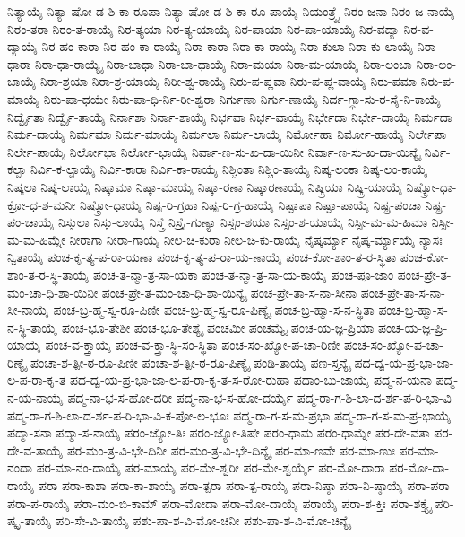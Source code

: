 {ನಿತ್ಯಾಯೈ
ನಿತ್ಯಾ-ಷೋ-ಡ-ಶಿ-ಕಾ-ರೂಪಾ
ನಿತ್ಯಾ-ಷೋ-ಡ-ಶಿ-ಕಾ-ರೂ-ಪಾಯೈ
ನಿಯಂತ್ರ್ಯೈ
ನಿರಂ-ಜನಾ
ನಿರಂ-ಜ-ನಾಯೈ
ನಿರಂ-ತರಾ
ನಿರಂ-ತ-ರಾಯೈ
ನಿರ-ತ್ಯಯಾ
ನಿರ-ತ್ಯ-ಯಾಯೈ
ನಿರ-ಪಾಯಾ
ನಿರ-ಪಾ-ಯಾಯೈ
ನಿರ-ವದ್ಯಾ
ನಿರ-ವ-ದ್ಯಾಯೈ
ನಿರ-ಹಂ-ಕಾರಾ
ನಿರ-ಹಂ-ಕಾ-ರಾಯೈ
ನಿರಾ-ಕಾರಾ
ನಿರಾ-ಕಾ-ರಾಯೈ
ನಿರಾ-ಕುಲಾ
ನಿರಾ-ಕು-ಲಾಯೈ
ನಿರಾ-ಧಾರಾ
ನಿರಾ-ಧಾ-ರಾಯ್ಯೈ
ನಿರಾ-ಬಾಧಾ
ನಿರಾ-ಬಾ-ಧಾಯೈ
ನಿರಾ-ಮಯಾ
ನಿರಾ-ಮ-ಯಾಯೈ
ನಿರಾ-ಲಂಬಾ
ನಿರಾ-ಲಂ-ಬಾಯೈ
ನಿರಾ-ಶ್ರಯಾ
ನಿರಾ-ಶ್ರ-ಯಾಯೈ
ನಿರೀ-ಶ್ವ-ರಾಯೈ
ನಿರು-ಪ-ಪ್ಲವಾ
ನಿರು-ಪ-ಪ್ಲ-ವಾಯೈ
ನಿರು-ಪಮಾ
ನಿರು-ಪ-ಮಾಯೈ
ನಿರು-ಪಾ-ಧಯೇ
ನಿರು-ಪಾ-ಧಿ-ರ್ನಿ-ರೀ-ಶ್ವರಾ
ನಿರ್ಗುಣಾ
ನಿರ್ಗು-ಣಾಯೈ
ನಿರ್ದ-ಗ್ಧಾ-ಸು-ರ-ಸೈ-ನಿ-ಕಾಯೈ
ನಿರ್ದ್ವೈತಾ
ನಿರ್ದ್ವೈ-ತಾಯೈ
ನಿರ್ನಾಶಾ
ನಿರ್ನಾ-ಶಾಯೈ
ನಿರ್ಭವಾ
ನಿರ್ಭ-ವಾಯೈ
ನಿರ್ಭೇದಾ
ನಿರ್ಭೇ-ದಾಯೈ
ನಿರ್ಮದಾ
ನಿರ್ಮ-ದಾಯೈ
ನಿರ್ಮಮಾ
ನಿರ್ಮ-ಮಾಯೈ
ನಿರ್ಮಲಾ
ನಿರ್ಮ-ಲಾಯೈ
ನಿರ್ಮೋಹಾ
ನಿರ್ಮೋ-ಹಾಯೈ
ನಿರ್ಲೇಪಾ
ನಿರ್ಲೇ-ಪಾಯೈ
ನಿರ್ಲೋಭಾ
ನಿರ್ಲೋ-ಭಾಯೈ
ನಿರ್ವಾ-ಣ-ಸು-ಖ-ದಾ-ಯಿನೀ
ನಿರ್ವಾ-ಣ-ಸು-ಖ-ದಾ-ಯಿನ್ಯೈ
ನಿರ್ವಿ-ಕಲ್ಪಾ
ನಿರ್ವಿ-ಕ-ಲ್ಪಾಯೈ
ನಿರ್ವಿ-ಕಾರಾ
ನಿರ್ವಿ-ಕಾ-ರಾಯೈ
ನಿಶ್ಚಿಂತಾ
ನಿಶ್ಚಿಂ-ತಾಯೈ
ನಿಷ್ಕ-ಲಂಕಾ
ನಿಷ್ಕ-ಲಂ-ಕಾಯೈ
ನಿಷ್ಕಲಾ
ನಿಷ್ಕ-ಲಾಯೈ
ನಿಷ್ಕಾಮಾ
ನಿಷ್ಕಾ-ಮಾಯೈ
ನಿಷ್ಕಾ-ರಣಾ
ನಿಷ್ಕಾರಣಾಯೈ
ನಿಷ್ಕ್ರಿಯಾ
ನಿಷ್ಕ್ರಿ-ಯಾಯೈ
ನಿಷ್ಕ್ರೋ-ಧಾ-ಕ್ರೋ-ಧ-ಶ-ಮನೀ
ನಿಷ್ಕ್ರೋ-ಧಾಯೈ
ನಿಷ್ಪ-ರಿ-ಗ್ರಹಾ
ನಿಷ್ಪ-ರಿ-ಗ್ರ-ಹಾಯೈ
ನಿಷ್ಪಾಪಾ
ನಿಷ್ಪಾ-ಪಾಯೈ
ನಿಷ್ಪ್ರ-ಪಂಚಾ
ನಿಷ್ಪ್ರ-ಪಂ-ಚಾಯೈ
ನಿಸ್ತುಲಾ
ನಿಸ್ತು-ಲಾಯೈ
ನಿಸ್ತ್ರೆ
ನಿಸ್ತ್ರೈ-ಗುಣ್ಯಾ
ನಿಸ್ಸಂ-ಶಯಾ
ನಿಸ್ಸಂ-ಶ-ಯಾಯೈ
ನಿಸ್ಸೀ-ಮ-ಮ-ಹಿಮಾ
ನಿಸ್ಸೀ-ಮ-ಮ-ಹಿಮ್ನೇ
ನೀರಾಗಾ
ನೀರಾ-ಗಾಯೈ
ನೀಲ-ಚಿ-ಕುರಾ
ನೀಲ-ಚಿ-ಕು-ರಾಯೈ
ನೈಷ್ಕರ್ಮ್ಯಾ
ನೈಷ್ಕ-ರ್ಮ್ಯಾಯೈ
ನ್ಯಾಸಃ
ನ್ವಿತಾಯೈ
ಪಂಚ-ಕೃ-ತ್ಯ-ಪ-ರಾ-ಯಣಾ
ಪಂಚ-ಕೃ-ತ್ಯ-ಪ-ರಾ-ಯ-ಣಾಯೈ
ಪಂಚ-ಕೋ-ಶಾಂ-ತ-ರ-ಸ್ಥಿತಾ
ಪಂಚ-ಕೋ-ಶಾಂ-ತ-ರ-ಸ್ಥಿ-ತಾಯೈ
ಪಂಚ-ತ-ನ್ಮಾ-ತ್ರ-ಸಾ-ಯಕಾ
ಪಂಚ-ತ-ನ್ಮಾ-ತ್ರ-ಸಾ-ಯ-ಕಾಯೈ
ಪಂಚ-ಪೂ-ಜಾಂ
ಪಂಚ-ಪ್ರೇ-ತ-ಮಂ-ಚಾ-ಧಿ-ಶಾ-ಯಿನೀ
ಪಂಚ-ಪ್ರೇ-ತ-ಮಂ-ಚಾ-ಧಿ-ಶಾ-ಯಿನ್ಯೈ
ಪಂಚ-ಪ್ರೇ-ತಾ-ಸ-ನಾ-ಸೀನಾ
ಪಂಚ-ಪ್ರೇ-ತಾ-ಸ-ನಾ-ಸೀ-ನಾಯೈ
ಪಂಚ-ಬ್ರ-ಹ್ಮ-ಸ್ವ-ರೂ-ಪಿಣೀ
ಪಂಚ-ಬ್ರ-ಹ್ಮ-ಸ್ವ-ರೂ-ಪಿಣ್ಯೈ
ಪಂಚ-ಬ್ರ-ಹ್ಮಾ-ಸ-ನ-ಸ್ಥಿತಾ
ಪಂಚ-ಬ್ರ-ಹ್ಮಾ-ಸ-ನ-ಸ್ಥಿ-ತಾಯೈ
ಪಂಚ-ಭೂ-ತೇಶೀ
ಪಂಚ-ಭೂ-ತೇಶ್ಯೈ
ಪಂಚಮೀ
ಪಂಚಮ್ಯೈ
ಪಂಚ-ಯ-ಜ್ಞ-ಪ್ರಿಯಾ
ಪಂಚ-ಯ-ಜ್ಞ-ಪ್ರಿ-ಯಾಯೈ
ಪಂಚ-ವ-ಕ್ತ್ರಾಯೈ
ಪಂಚ-ವ-ಕ್ತ್ರಾ-ಸ್ಥಿ-ಸಂ-ಸ್ಥಿತಾ
ಪಂಚ-ಸಂ-ಖ್ಯೋ-ಪ-ಚಾ-ರಿಣೀ
ಪಂಚ-ಸಂ-ಖ್ಯೋ-ಪ-ಚಾ-ರಿಣ್ಯೈ
ಪಂಚಾ-ಶ-ತ್ಪೀ-ಠ-ರೂ-ಪಿಣೀ
ಪಂಚಾ-ಶ-ತ್ಪೀ-ಠ-ರೂ-ಪಿಣ್ಯೈ
ಪಂಡಿ-ತಾಯೈ
ಪಣ-ಸ್ತನ್ಯೈ
ಪದ-ದ್ವ-ಯ-ಪ್ರ-ಭಾ-ಜಾ-ಲ-ಪ-ರಾ-ಕೃ-ತ
ಪದ-ದ್ವ-ಯ-ಪ್ರ-ಭಾ-ಜಾ-ಲ-ಪ-ರಾ-ಕೃ-ತ-ಸ-ರೋ-ರುಹಾ
ಪದಾಂ-ಬು-ಜಾಯೈ
ಪದ್ಮ-ನ-ಯನಾ
ಪದ್ಮ-ನ-ಯ-ನಾಯೈ
ಪದ್ಮ-ನಾ-ಭ-ಸ-ಹೋ-ದರೀ
ಪದ್ಮ-ನಾ-ಭ-ಸ-ಹೋ-ದರ್ಯೈ
ಪದ್ಮ-ರಾ-ಗ-ಶಿ-ಲಾ-ದ-ರ್ಶ-ಪ-ರಿ-ಭಾ-ವಿ
ಪದ್ಮ-ರಾ-ಗ-ಶಿ-ಲಾ-ದ-ರ್ಶ-ಪ-ರಿ-ಭಾ-ವಿ-ಕ-ಪೋ-ಲ-ಭೂಃ
ಪದ್ಮ-ರಾ-ಗ-ಸ-ಮ-ಪ್ರಭಾ
ಪದ್ಮ-ರಾ-ಗ-ಸ-ಮ-ಪ್ರ-ಭಾಯೈ
ಪದ್ಮಾ-ಸನಾ
ಪದ್ಮಾ-ಸ-ನಾಯೈ
ಪರಂ-ಜ್ಯೋ-ತಿಃ
ಪರಂ-ಜ್ಯೋ-ತಿಷೇ
ಪರಂ-ಧಾಮ
ಪರಂ-ಧಾಮ್ನೇ
ಪರ-ದೇ-ವತಾ
ಪರ-ದೇ-ವ-ತಾಯೈ
ಪರ-ಮಂ-ತ್ರ-ವಿ-ಭೇ-ದಿನೀ
ಪರ-ಮಂ-ತ್ರ-ವಿ-ಭೇ-ದಿನ್ಯೈ
ಪರ-ಮಾ-ಣವೇ
ಪರ-ಮಾ-ಣುಃ
ಪರ-ಮಾ-ನಂದಾ
ಪರ-ಮಾ-ನಂ-ದಾಯೈ
ಪರ-ಮಾಯೈ
ಪರ-ಮೇ-ಶ್ವರೀ
ಪರ-ಮೇ-ಶ್ವರ್ಯೈ
ಪರ-ಮೋ-ದಾರಾ
ಪರ-ಮೋ-ದಾ-ರಾಯೈ
ಪರಾ
ಪರಾ-ಕಾಶಾ
ಪರಾ-ಕಾ-ಶಾಯೈ
ಪರಾ-ತ್ಪರಾ
ಪರಾ-ತ್ಪ-ರಾಯೈ
ಪರಾ-ನಿಷ್ಠಾ
ಪರಾ-ನಿ-ಷ್ಠಾಯೈ
ಪರಾ-ಪರಾ
ಪರಾ-ಪ-ರಾಯೈ
ಪರಾ-ಮಂ-ಬಿ-ಕಾಮ್
ಪರಾ-ಮೋದಾ
ಪರಾ-ಮೋ-ದಾಯೈ
ಪರಾಯೈ
ಪರಾ-ಶ-ಕ್ತಿಃ
ಪರಾ-ಶಕ್ತ್ಯೈ
ಪರಿ-ಷ್ಕೃ-ತಾಯೈ
ಪರಿ-ಸೇ-ವಿ-ತಾಯೈ
ಪಶು-ಪಾ-ಶ-ವಿ-ಮೋ-ಚಿನೀ
ಪಶು-ಪಾ-ಶ-ವಿ-ಮೋ-ಚಿನ್ಯೈ
}
